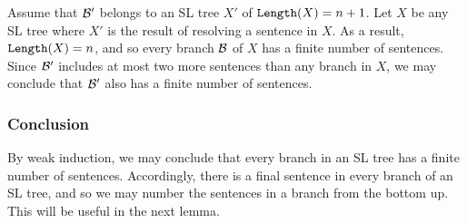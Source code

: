 Assume that $\mathcal{B}'$ belongs to an SL tree $X'$ of $\texttt{Length}(X)=n+1$. 
Let $X$ be any SL tree where $X'$ is the result of resolving a sentence in $X$. 
As a result, $\texttt{Length}(X)=n$, and so every branch $\mathcal{B}$ of $X$ has a finite number of sentences.
Since $\mathcal{B}'$ includes at most two more sentences than any branch in $X$, we may conclude that $\mathcal{B}'$ also has a finite number of sentences. 

\subsubsection{Conclusion}

By weak induction, we may conclude that every branch in an SL tree has a finite number of sentences.
Accordingly, there is a final sentence in every branch of an SL tree, and so we may number the sentences in a branch from the bottom up.
This will be useful in the next lemma.

%
%
%

